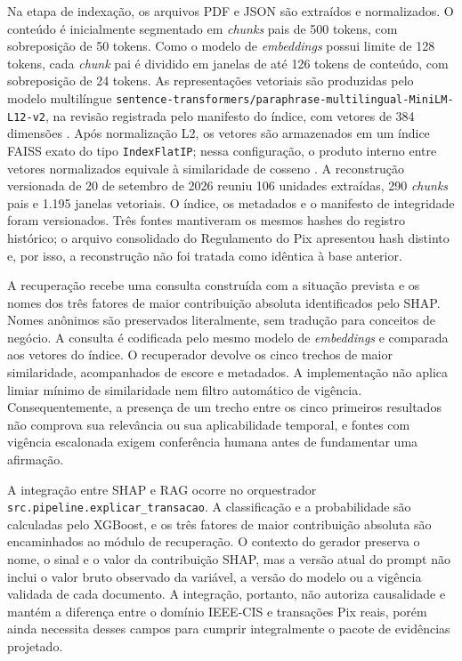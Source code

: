 Na etapa de indexação, os arquivos PDF e JSON são extraídos e normalizados. O conteúdo é inicialmente segmentado em \emph{chunks} pais de 500 tokens, com sobreposição de 50 tokens. Como o modelo de \emph{embeddings} possui limite de 128 tokens, cada \emph{chunk} pai é dividido em janelas de até 126 tokens de conteúdo, com sobreposição de 24 tokens. As representações vetoriais são produzidas pelo modelo multilíngue \texttt{sentence-transformers/paraphrase-multilingual-MiniLM-L12-v2}, na revisão registrada pelo manifesto do índice, com vetores de 384 dimensões \cite{reimers2019sentencebert}. Após normalização L2, os vetores são armazenados em um índice FAISS exato do tipo \texttt{IndexFlatIP}; nessa configuração, o produto interno entre vetores normalizados equivale à similaridade de cosseno \cite{johnson2021billion}. A reconstrução versionada de 20 de setembro de 2026 reuniu 106 unidades extraídas, 290 \emph{chunks} pais e 1.195 janelas vetoriais. O índice, os metadados e o manifesto de integridade foram versionados. Três fontes mantiveram os mesmos hashes do registro histórico; o arquivo consolidado do Regulamento do Pix apresentou hash distinto e, por isso, a reconstrução não foi tratada como idêntica à base anterior.

A recuperação recebe uma consulta construída com a situação prevista e os nomes dos três fatores de maior contribuição absoluta identificados pelo SHAP. Nomes anônimos são preservados literalmente, sem tradução para conceitos de negócio. A consulta é codificada pelo mesmo modelo de \emph{embeddings} e comparada aos vetores do índice. O recuperador devolve os cinco trechos de maior similaridade, acompanhados de escore e metadados. A implementação não aplica limiar mínimo de similaridade nem filtro automático de vigência. Consequentemente, a presença de um trecho entre os cinco primeiros resultados não comprova sua relevância ou sua aplicabilidade temporal, e fontes com vigência escalonada exigem conferência humana antes de fundamentar uma afirmação.

A integração entre SHAP e RAG ocorre no orquestrador \texttt{src.pipeline.explicar\_transacao}. A classificação e a probabilidade são calculadas pelo XGBoost, e os três fatores de maior contribuição absoluta são encaminhados ao módulo de recuperação. O contexto do gerador preserva o nome, o sinal e o valor da contribuição SHAP, mas a versão atual do prompt não inclui o valor bruto observado da variável, a versão do modelo ou a vigência validada de cada documento. A integração, portanto, não autoriza causalidade e mantém a diferença entre o domínio IEEE-CIS e transações Pix reais, porém ainda necessita desses campos para cumprir integralmente o pacote de evidências projetado.

